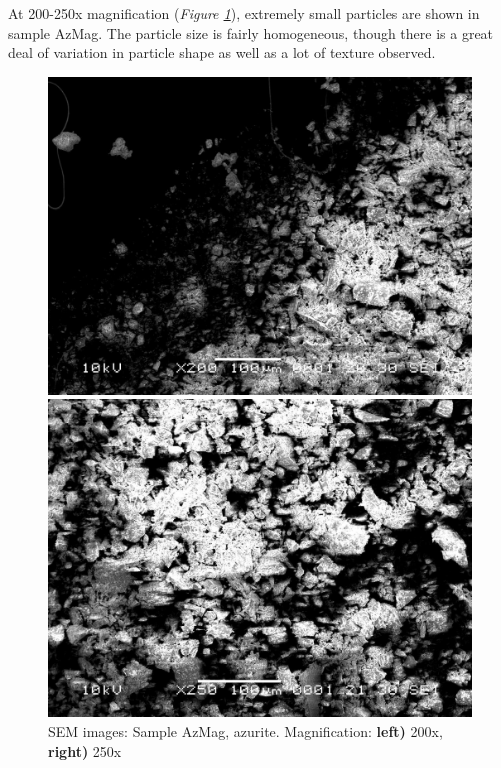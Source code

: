 At 200-250x magnification (\textit{Figure \ref{fig:azmag_sem_2}}), extremely small particles are shown in sample AzMag. The particle size is fairly homogeneous, though there is a great deal of variation in particle shape as well as a lot of texture observed.

\begin{figure}[H]
\centering
\begin{minipage}{.45\textwidth}
  \centering
  \includegraphics[width=\linewidth]{AzMag_x200_1_260221}
\end{minipage}
\begin{minipage}{.45\textwidth}
  \centering
  \includegraphics[width=\linewidth]{AzMag_x250_2_160321}
\end{minipage}
\caption[SEM images: Sample AzMag, azurite]{SEM images: Sample AzMag, azurite. Magnification: \textbf{left)} 200x, \textbf{right)} 250x}
\label{fig:azmag_sem_2}
\end{figure}


